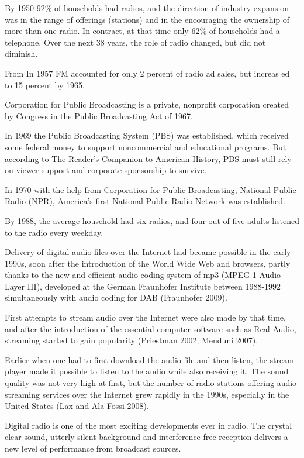 \documentclass[a4paper,norsk,utf8]{report}
\begin{document}
    By 1950 92\% of households had radios, and the direction of
    industry expansion was in the range of offerings (stations) and in
    the encouraging the ownership of more than one radio.  In
    contract, at that time only 62\% of households had a telephone.
    Over the next 38 years, the role of radio changed, but did not
    diminish.

    From In 1957 FM accounted for only 2 percent of radio ad sales,
    but increas ed to 15 percent by 1965.

    Corporation for Public Broadcasting is a private, nonprofit
    corporation created by Congress in the Public Broadcasting Act of
    1967.

    In 1969 the Public Broadcasting System (PBS) was established, which received
    some federal money to support noncommercial and educational programs.
    But according to The Reader's Companion to American History, PBS must
    still rely on viewer support and corporate sponsorship to survive.

    In 1970 with the help from Corporation for Public Broadcasting, National
    Public Radio (NPR), America's first National Public Radio Network was
    established.

    By 1988, the average household had six radios, and four out of
    five adults listened to the radio every weekday.

    Delivery of digital audio files over the Internet had became
    possible in the early 1990s, soon after the introduction of the
    World Wide Web and browsers, partly thanks to the new and
    efficient audio coding system of mp3 (MPEG-1 Audio Layer III),
    developed at the German Fraunhofer Institute between 1988-1992
    simultaneously with audio coding for DAB (Fraunhofer 2009).

    First attempts to stream audio over the Internet were also made by
    that time, and after the introduction of the essential computer
    software such as Real Audio, streaming started to gain popularity
    (Priestman 2002; Menduni 2007).

    Earlier when one had to first download the audio file and then
    listen, the stream player made it possible to listen to the audio
    while also receiving it.  The sound quality was not very high at
    first, but the number of radio stations offering audio streaming
    services over the Internet grew rapidly in the 1990s, especially
    in the United States (Lax and Ala-Fossi 2008).

    Digital radio is one of the most exciting developments ever in
    radio.  The crystal clear sound, utterly silent background and
    interference free reception delivers a new level of performance
    from broadcast sources.
\end{document}
